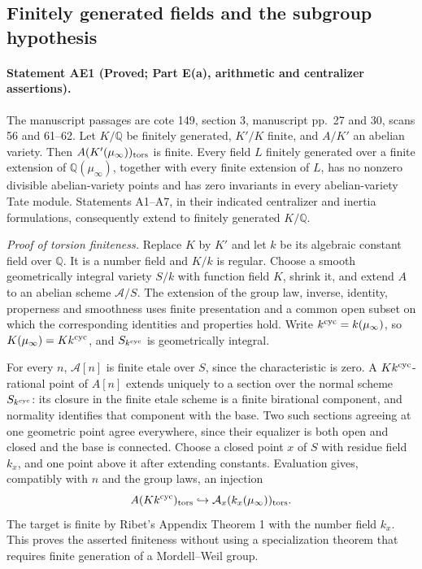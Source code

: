 \subsection{Finitely generated fields and the subgroup hypothesis}
\paragraph{Statement AE1 (Proved; Part E(a), arithmetic and centralizer assertions).}\label{res:AE1}
The manuscript passages are cote 149, section 3, manuscript pp.~27 and 30, scans 56 and 61--62.
Let $K/\mathbb Q$ be finitely generated, $K'/K$ finite, and $A/K'$ an abelian variety. Then $A(K'(\mu_\infty))_{\rm tors}$ is finite. Every field $L$ finitely generated over a finite extension of $\mathbb Q(\mu_\infty)$, together with every finite extension of $L$, has no nonzero divisible abelian-variety points and has zero invariants in every abelian-variety Tate module. Statements A1--A7, in their indicated centralizer and inertia formulations, consequently extend to finitely generated $K/\mathbb Q$.

\emph{Proof of torsion finiteness.} Replace $K$ by $K'$ and let $k$ be its algebraic constant field over $\mathbb Q$. It is a number field and $K/k$ is regular. Choose a smooth geometrically integral variety $S/k$ with function field $K$, shrink it, and extend $A$ to an abelian scheme $\mathcal A/S$. The extension of the group law, inverse, identity, properness and smoothness uses finite presentation and a common open subset on which the corresponding identities and properties hold. Write $k^{\rm cyc}=k(\mu_\infty)$, so $K(\mu_\infty)=Kk^{\rm cyc}$, and $S_{k^{\rm cyc}}$ is geometrically integral.

For every $n$, $\mathcal A[n]$ is finite etale over $S$, since the characteristic is zero. A $Kk^{\rm cyc}$-rational point of $A[n]$ extends uniquely to a section over the normal scheme $S_{k^{\rm cyc}}$: its closure in the finite etale scheme is a finite birational component, and normality identifies that component with the base. Two such sections agreeing at one geometric point agree everywhere, since their equalizer is both open and closed and the base is connected. Choose a closed point $x$ of $S$ with residue field $k_x$, and one point above it after extending constants. Evaluation gives, compatibly with $n$ and the group laws, an injection
\[
 A(Kk^{\rm cyc})_{\rm tors}\hookrightarrow
 \mathcal A_x(k_x(\mu_\infty))_{\rm tors}.
\]
The target is finite by Ribet's Appendix Theorem 1 with the number field $k_x$. This proves the asserted finiteness without using a specialization theorem that requires finite generation of a Mordell--Weil group.

